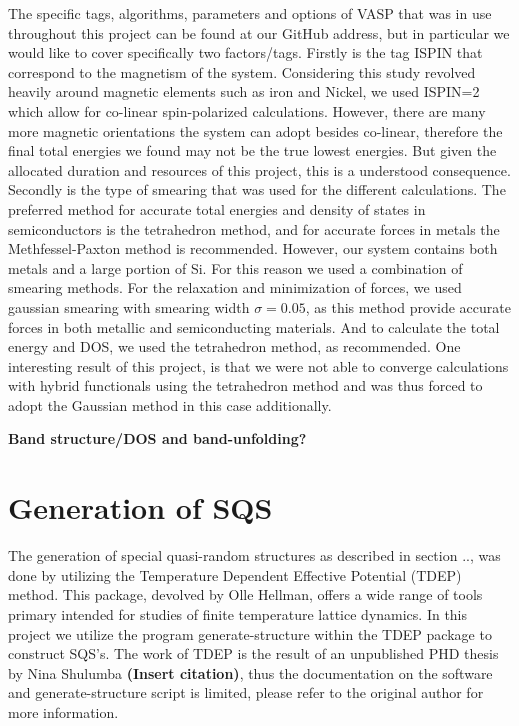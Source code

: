 The specific tags, algorithms, parameters and options of VASP that was in use throughout this project can be found at our GitHub address, but in particular we would like to cover specifically two factors/tags. Firstly is the tag ISPIN that correspond to the magnetism of the system. Considering this study revolved heavily around magnetic elements such as iron and Nickel, we used ISPIN=2 which allow for co-linear spin-polarized calculations. However, there are many more magnetic orientations the system can adopt besides co-linear, therefore the final total energies we found may not be the true lowest energies. But given the allocated duration and resources of this project, this is a understood consequence. Secondly is the type of smearing that was used for the different calculations. The preferred method for accurate total energies and density of states in semiconductors is the tetrahedron method, and for accurate forces in metals the Methfessel-Paxton method is recommended. However, our system contains both metals and a large portion of Si. For this reason we used a combination of smearing methods. For the relaxation and minimization of forces, we used gaussian smearing with smearing width $\sigma = 0.05$, as this method provide accurate forces in both metallic and semiconducting materials. And to calculate the total energy and DOS, we used the tetrahedron method, as recommended. One interesting result of this project, is that we were not able to converge calculations with hybrid functionals using the tetrahedron method and was thus forced to adopt the Gaussian method in this case additionally. 

\textbf{Band structure/DOS and band-unfolding?}

\section{Generation of SQS}
The generation of special quasi-random structures as described in section .., was done by utilizing the Temperature Dependent Effective Potential (TDEP) method. This package, devolved by Olle Hellman, offers a wide range of tools primary intended for studies of finite temperature lattice dynamics. In this project we utilize the program generate-structure within the TDEP package to construct SQS's. The work of TDEP is the result of an unpublished PHD thesis by Nina Shulumba \textbf{(Insert citation)}, thus the documentation on the software and generate-structure script is limited, please refer to the original author for more information. 

